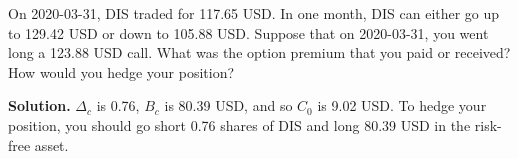 \noindent On 2020-03-31, DIS traded for 117.65 USD. In one month, DIS can either go up to 129.42 USD or down to 105.88 USD. Suppose that on 2020-03-31, you went long a 123.88 USD call. What was the option premium that you paid or received? How would you hedge your position?

\vspace{9pt}

\noindent\textbf{Solution.} $\Delta_{c}$ is 0.76, $B_{c}$ is 80.39 USD, and so $C_{0}$ is 9.02 USD. To hedge your position, you should go short 0.76 shares of DIS and long 80.39 USD in the risk-free asset.